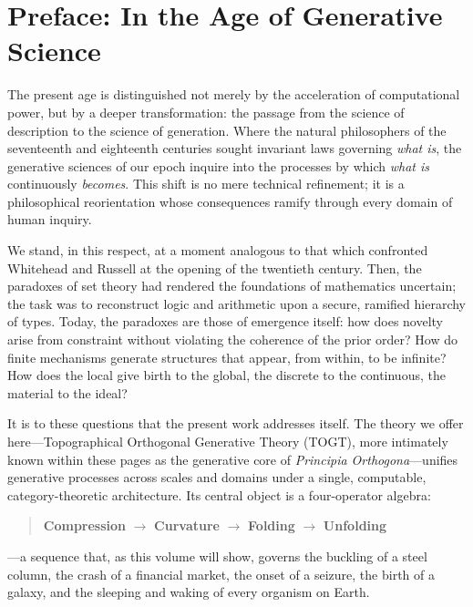 \documentclass[12pt, oneside]{book}
\theoremstyle{plain}
\theoremstyle{definition}
\theoremstyle{remark}
\begin{document}
\chapter*{Preface: In the Age of Generative Science}

The present age is distinguished not merely by the acceleration
of computational power, but by a deeper transformation: the passage
from the science of description to the science of generation. Where
the natural philosophers of the seventeenth and eighteenth centuries
sought invariant laws governing \emph{what is}, the generative
sciences of our epoch inquire into the processes by which \emph{what
is} continuously \emph{becomes}. This shift is no mere technical
refinement; it is a philosophical reorientation whose consequences
ramify through every domain of human inquiry.

We stand, in this respect, at a moment analogous to that which
confronted Whitehead and Russell at the opening of the twentieth
century. Then, the paradoxes of set theory had rendered the
foundations of mathematics uncertain; the task was to reconstruct
logic and arithmetic upon a secure, ramified hierarchy of types.
Today, the paradoxes are those of emergence itself: how does novelty
arise from constraint without violating the coherence of the prior
order? How do finite mechanisms generate structures that appear,
from within, to be infinite? How does the local give birth to the
global, the discrete to the continuous, the material to the ideal?

It is to these questions that the present work addresses itself.
The theory we offer here---Topographical Orthogonal Generative Theory
(TOGT), more intimately known within these pages as the generative
core of \emph{Principia Orthogona}---unifies generative processes
across scales and domains under a single, computable, category-theoretic
architecture. Its central object is a four-operator algebra:

\begin{quote}
\textbf{Compression} $\to$ \textbf{Curvature} $\to$ \textbf{Folding}
$\to$ \textbf{Unfolding}
\end{quote}

\noindent---a sequence that, as this volume will show, governs the
buckling of a steel column, the crash of a financial market, the
onset of a seizure, the birth of a galaxy, and the sleeping and
waking of every organism on Earth.
\end{document}
